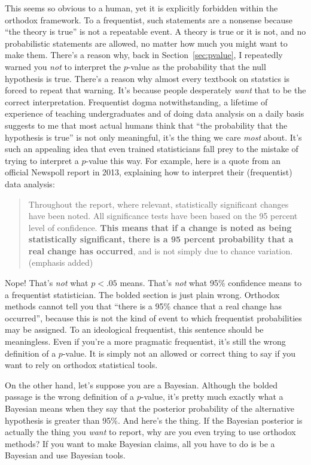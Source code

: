 This seems so obvious to a human, yet it is explicitly forbidden within the orthodox framework. To a frequentist, such statements are a nonsense because ``the theory is true'' is not a repeatable event. A theory is true or it is not, and no probabilistic statements are allowed, no matter how much you might want to make them. There's a reason why, back in Section~\ref{sec:pvalue}, I repeatedly warned you {\it not} to interpret the $p$-value as the probability that the null hypothesis is true. There's a reason why almost every textbook on statstics is forced to repeat that warning. It's because people desperately {\it want} that to be the correct interpretation. Frequentist dogma notwithstanding, a lifetime of experience of teaching undergraduates and of doing data analysis on a daily basis suggests to me that most actual humans think that ``the probability that the hypothesis is true'' is not only meaningful, it's the thing we care {\it most} about. It's such an appealing idea that even trained statisticians fall prey to the mistake of trying to interpret a $p$-value this way. For example, here is a quote from an official Newspoll report in 2013, explaining how to interpret their (frequentist) data analysis:
\begin{quote}
Throughout the report, where relevant, statistically significant changes have been noted. All significance tests have been based on the 95 percent level of confidence. {\bf This means that if a change is noted as being statistically significant, there is a 95 percent probability that a real change has occurred}, and is not simply due to chance variation. (emphasis added)
\end{quote}
Nope! That's {\it not} what $p<.05$ means. That's {\it not} what 95\% confidence means to a frequentist statistician. The bolded section is just plain wrong. Orthodox methods cannot tell you that ``there is a 95\% chance that a real change has occurred'', because this is not the kind of event to which frequentist probabilities may be assigned. To an ideological frequentist, this sentence should be meaningless. Even if you're a more pragmatic frequentist, it's still the wrong definition of a $p$-value. It is simply not an allowed or correct thing to say if you want to rely on orthodox statistical tools. 

On the other hand, let's suppose you are a Bayesian. Although the bolded passage is the wrong definition of a $p$-value, it's pretty much exactly what a Bayesian means when they say that the posterior probability of the alternative hypothesis is greater than 95\%. And here's the thing. If the Bayesian posterior is actually the thing you {\it want} to report, why are you even trying to use orthodox methods? If you want to make Bayesian claims, all you have to do is be a Bayesian and use Bayesian tools. 

